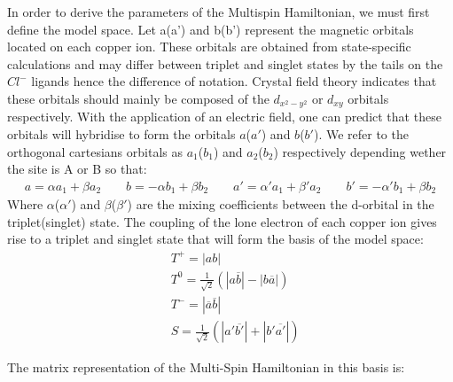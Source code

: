 \documentclass[10pt]{report}
\numberwithin{equation}{section}
\begin{document}
In order to derive the parameters of the Multispin Hamiltonian, we must first define the model space.
Let a(a') and b(b') represent the magnetic orbitals located on each copper ion. These orbitals are obtained from state-specific calculations and may differ between triplet and singlet states by the tails on the $Cl^-$ ligands hence the difference of notation.
Crystal field theory indicates that these orbitals should mainly be composed of the $d_{x^2-y^2}$ or $d_{xy}$ orbitals respectively.
With the application of an electric field, one can predict that these orbitals will hybridise to form the orbitals $a$($a'$) and $b$($b'$).
We refer to the orthogonal cartesians orbitals as $a_1$($b_1$) and $a_2$($b_2$) respectively depending wether the site is A or B so that:
\begin{align}
    a=\alpha a_1 + \beta a_2 \qquad b=-\alpha b_1  + \beta b_2 \qquad a'= \alpha ' a_1 +\beta ' a_2 \qquad b'=-\alpha' b_1 +\beta b_2
\end{align}
Where $\alpha$($\alpha'$) and $\beta$($\beta'$) are the mixing coefficients between the d-orbital in the triplet(singlet) state.
The coupling of the lone electron of each copper ion gives rise to a triplet and singlet state that will form the basis of the model space:
\begin{align}
    &T^+=|ab|\\
    &T^0=\frac{1}{\sqrt{2}}(|a\overline{b}|-|b\overline{a}|)\\
    &T^-=|\overline{a}\overline{b}|\\
    &S=\frac{1}{\sqrt{2}}(|a'\overline{b'}|+|b'\overline{a'}|)
\end{align}

The matrix representation of the Multi-Spin Hamiltonian in this basis is:
\end{document}
